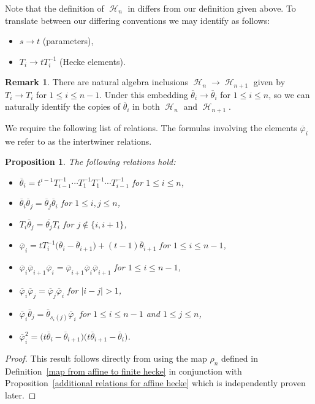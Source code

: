 \documentclass[pdftex]{sigma}
\numberwithin{equation}{section}
\newtheorem{Proposition}[Theorem]{Proposition}
\theoremstyle{definition}
\newtheorem{Remark}[Theorem]{Remark}
\DeclareMathOperator{\sH}{\mathscr{H}}
\begin{document}
Note that the definition of $\sH_n$ in \cite[Section~2.1]{DL_2011} differs from our definition given above. To translate between our differing conventions we may identify as follows:
\begin{itemize}\itemsep=0pt
 \item $s \rightarrow t$ (parameters),
 \item $T_i \rightarrow tT_i^{-1}$ (Hecke elements).
\end{itemize}


\begin{Remark}
 There are natural algebra inclusions $\sH_{n} \rightarrow \sH_{n+1}$ given by $T_i \rightarrow T_i$ for $1\leq i \leq n-1$. Under this embedding $\overline{\theta}_i \rightarrow \overline{\theta}_i$ for $1 \leq i \leq n$, so we can naturally identify the copies of $\overline{\theta}_i$ in both $\sH_n$ and $\sH_{n+1}$.
\end{Remark}

We require the following list of relations. The formulas involving the elements $\overline{\varphi}_i$ we refer to as the intertwiner relations.

\begin{Proposition}\label{additional relations for finite hecke}
 The following relations hold:
 \begin{itemize}
\itemsep=0pt
 \item $\overline{\theta}_i = t^{i-1}T_{i-1}^{-1}\cdots T_{1}^{-1}T_{1}^{-1}\cdots T_{i-1}^{-1}$ for $1\leq i \leq n$,
 \item $\overline{\theta}_i\overline{\theta}_j = \overline{\theta}_j\overline{\theta}_i$ for $1\leq i,j \leq n$,
 \item $T_i\overline{\theta}_j = \overline{\theta_j}T_i$ for $j \notin \{i,i+1\}$,
 \item $\overline{\varphi}_i = tT_{i}^{-1}\bigl(\overline{\theta}_i - \overline{\theta}_{i+1}\bigr) + (t-1)\overline{\theta}_{i+1}$ for $1 \leq i \leq n-1$,
 \item $\overline{\varphi}_i\overline{\varphi}_{i+1}\overline{\varphi}_i=\overline{\varphi}_{i+1}\overline{\varphi}_i\overline{\varphi}_{i+1}$ for $1\leq i \leq n-1$,
 \item $\overline{\varphi}_i\overline{\varphi}_j = \overline{\varphi}_j\overline{\varphi}_i$ for $|i-j| >1$,
 \item $\overline{\varphi}_{i}\overline{\theta}_j = \overline{\theta}_{s_i(j)}\overline{\varphi}_{i}$ for $1\leq i \leq n-1$ and $1 \leq j \leq n$,
 \item $\overline{\varphi}_i^{2} = \bigl(t\overline{\theta}_i-\overline{\theta}_{i+1}\bigr)\bigl(t\overline{\theta}_{i+1}-\overline{\theta}_{i}\bigr)$.
 \end{itemize}
\end{Proposition}
\begin{proof}
This result follows directly from using the map $\rho_n$ defined in Definition~\ref{map from affine to finite hecke} in conjunction with Proposition~\ref{additional relations for affine hecke} which is independently proven later.
\end{proof}
\end{document}
